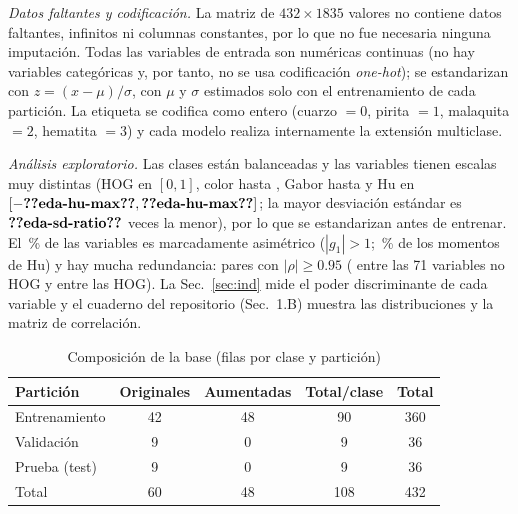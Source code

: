 \documentclass[journal]{IEEEtran}
\begin{document}
\emph{Datos faltantes y codificación.} La matriz de $432\times1835$ valores no contiene datos faltantes, infinitos ni columnas constantes, por lo que no fue necesaria ninguna imputación. Todas las variables de entrada son numéricas continuas (no hay variables categóricas y, por tanto, no se usa codificación \emph{one-hot}); se estandarizan con $z=(x-\mu)/\sigma$, con $\mu$ y $\sigma$ estimados solo con el entrenamiento de cada partición. La etiqueta se codifica como entero (cuarzo $=0$, pirita $=1$, malaquita $=2$, hematita $=3$) y cada modelo realiza internamente la extensión multiclase.

\emph{Análisis exploratorio.} Las clases están balanceadas y las variables tienen escalas muy distintas (HOG en $[0,1]$, color hasta , Gabor hasta  y Hu en $[-\N{eda-hu-max},\N{eda-hu-max}]$; la mayor desviación estándar es $\N{eda-sd-ratio}$ veces la menor), por lo que se estandarizan antes de entrenar. El \,\% de las variables es marcadamente asimétrico ($|g_1|>1$; \,\% de los momentos de Hu) y hay mucha redundancia:  pares con $|\rho|\ge0.95$ ( entre las 71 variables no HOG y  entre las HOG). La Sec.~\ref{sec:ind} mide el poder discriminante de cada variable y el cuaderno del repositorio (Sec.~1.B) muestra las distribuciones y la matriz de correlación.

\begin{table}[!t]
\caption{Composición de la base (filas por clase y partición)}
\label{tab:comp}
\centering\footnotesize
\setlength{\tabcolsep}{4pt}
\begin{tabular}{lcccc}
\toprule
Partición & Originales & Aumentadas & Total/clase & Total\\
\midrule
Entrenamiento & 42 & 48 & 90 & 360\\
Validación & 9 & 0 & 9 & 36\\
Prueba (test) & 9 & 0 & 9 & 36\\
\midrule
Total & 60 & 48 & 108 & 432\\
\bottomrule
\end{tabular}
\end{table}
\end{document}
